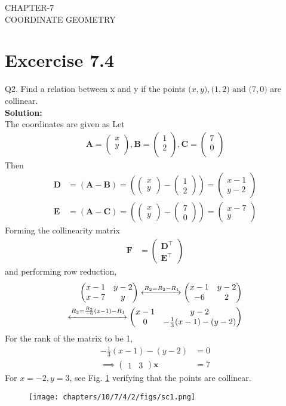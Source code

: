 \documentclass[12pt]{article}
\providecommand{\brak}[1]{\ensuremath{\left(#1\right)}}
\newcommand{\solution}{\noindent \textbf{Solution: }}
\newcommand{\myvec}[1]{\ensuremath{\begin{pmatrix}#1\end{pmatrix}}}
\let\vec\mathbf
\begin{document}
\begin{center}
\textbf\large{CHAPTER-7 \\ COORDINATE GEOMETRY}
\end{center}
\section*{Excercise 7.4}

Q2. Find a relation between x and y if the points $\vec(x, y), \vec(1, 2) \text{ and } \vec(7, 0)$ are collinear.
\\
\solution
\\
The coordinates are given as
\fi
Let
	\begin{align}
	\vec{A} = \myvec{
		x\\
		y\\
		},
	\vec{B} = \myvec{
		1\\
		2\\
		},
	\vec{C} = \myvec{
		7\\
		0\\
		}
	\end{align}
	Then
	\begin{align}
\vec{D} &=\brak{\vec{A}-\vec{B}} = \brak{\myvec{x \\y } - \myvec{1 \\2 } } = \myvec{x-1 \\ y-2 }\\
\vec{E} &= \brak{\vec{A}-\vec{C}} = \brak{\myvec{x \\ y } - \myvec{7 \\0} } = \myvec{x-7 \\y}
\end{align}
Forming the collinearity matrix
\begin{align}
	\vec{F} &={\myvec{\vec{D}^{\top}\\ \vec{E}^{\top}}}
\end{align}
and performing row reduction,
\begin{align}
\label{eq:chapters/10/7/4/2chem_balance_mat_row}
\myvec{
x-1 & y-2
\\
x-7 & y
}
\xleftrightarrow[]{R_2 = R_2-R_1}
\myvec{
  x-1 & y-2
  \\
	  -6 & 2                 
	  }
	  \\
	\xleftrightarrow[]{R_2 = \frac{R_2}{-6}(x-1)-R_1}
\myvec{
x-1 & y-2
\\
	0 & -\frac{1}{3}(x-1)-(y-2)
}
\end{align}
For the rank of the matrix to be 1,
\begin{align}
	-\frac{1}{3}(x-1)-(y-2)&=0\\
	\implies \myvec{1 & 3}\vec{x} &=7	
\end{align}
For $x=-2, y=3$, see Fig. \ref{fig:chapters/10/7/4/2Fig} verifying that the points are collinear.
\begin{figure}[H]
	\begin{center} 
	    \texttt{[image: chapters/10/7/4/2/figs/sc1.png]}
	\end{center}
\caption{}
\label{fig:chapters/10/7/4/2Fig}
\end{figure}
\end{document}
